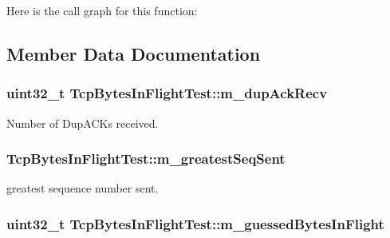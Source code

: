 Here is the call graph for this function\+:




\subsection{Member Data Documentation}
\subsubsection[{\texorpdfstring{m\+\_\+dup\+Ack\+Recv}{m_dupAckRecv}}]{\setlength{\rightskip}{0pt plus 5cm}uint32\+\_\+t Tcp\+Bytes\+In\+Flight\+Test\+::m\+\_\+dup\+Ack\+Recv\hspace{0.3cm}{\ttfamily [private]}}\hypertarget{classTcpBytesInFlightTest_ab641cde492bd6498f83d5b54e0210554}{}\label{classTcpBytesInFlightTest_ab641cde492bd6498f83d5b54e0210554}


Number of Dup\+A\+C\+Ks received. 

\subsubsection[{\texorpdfstring{m\+\_\+greatest\+Seq\+Sent}{m_greatestSeqSent}}]{ Tcp\+Bytes\+In\+Flight\+Test\+::m\+\_\+greatest\+Seq\+Sent\hspace{0.3cm}{\ttfamily [private]}}\hypertarget{classTcpBytesInFlightTest_afc1cef29d8e27173973250647069060c}{}\label{classTcpBytesInFlightTest_afc1cef29d8e27173973250647069060c}


greatest sequence number sent. 

\subsubsection[{\texorpdfstring{m\+\_\+guessed\+Bytes\+In\+Flight}{m_guessedBytesInFlight}}]{\setlength{\rightskip}{0pt plus 5cm}uint32\+\_\+t Tcp\+Bytes\+In\+Flight\+Test\+::m\+\_\+guessed\+Bytes\+In\+Flight\hspace{0.3cm}{\ttfamily [private]}}\hypertarget{classTcpBytesInFlightTest_a746a64e877ab18748c5e84e6b48f9105}{}\label{classTcpBytesInFlightTest_a746a64e877ab18748c5e84e6b48f9105}


